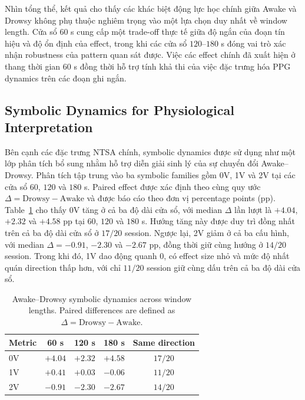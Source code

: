 Nhìn tổng thể, kết quả cho thấy các khác biệt động lực học chính giữa Awake và Drowsy không phụ thuộc nghiêm trọng vào một lựa chọn duy nhất về window length. Cửa sổ $60$ s cung cấp một trade-off thực tế giữa độ ngắn của đoạn tín hiệu và độ ổn định của effect, trong khi các cửa sổ $120$--$180$ s đóng vai trò xác nhận robustness của pattern quan sát được. Việc các effect chính đã xuất hiện ở thang thời gian $60$ s đồng thời hỗ trợ tính khả thi của việc đặc trưng hóa PPG dynamics trên các đoạn ghi ngắn.

\subsection{Symbolic Dynamics for Physiological Interpretation}

Bên cạnh các đặc trưng NTSA chính, symbolic dynamics được sử dụng như một lớp phân tích bổ sung nhằm hỗ trợ diễn giải sinh lý của sự chuyển đổi Awake--Drowsy. Phân tích tập trung vào ba symbolic families gồm 0V, 1V và 2V tại các cửa sổ $60$, $120$ và $180$ s. Paired effect được xác định theo cùng quy ước $\Delta=\mathrm{Drowsy}-\mathrm{Awake}$ và được báo cáo theo đơn vị percentage points (pp). Table~\ref{tab:symbolic_results} cho thấy 0V tăng ở cả ba độ dài cửa sổ, với median $\Delta$ lần lượt là $+4.04$, $+2.32$ và $+4.58$ pp tại $60$, $120$ và $180$ s. Hướng tăng này được duy trì đồng nhất trên cả ba độ dài cửa sổ ở $17/20$ session. Ngược lại, 2V giảm ở cả ba cấu hình, với median $\Delta=-0.91$, $-2.30$ và $-2.67$ pp, đồng thời giữ cùng hướng ở $14/20$ session. Trong khi đó, 1V dao động quanh $0$, có effect size nhỏ và mức độ nhất quán direction thấp hơn, với chỉ $11/20$ session giữ cùng dấu trên cả ba độ dài cửa sổ.

\begin{table}[t]
    \centering
    \caption{Awake--Drowsy symbolic dynamics across window lengths. Paired differences are defined as $\Delta=\mathrm{Drowsy}-\mathrm{Awake}$.}
    \label{tab:symbolic_results}
    \footnotesize
    \setlength{\tabcolsep}{4pt}
    \renewcommand{\arraystretch}{1.10}

    \begin{tabular}{lcccc}
        \toprule
        \textbf{Metric}
        & \textbf{60 s}
        & \textbf{120 s}
        & \textbf{180 s}
        & \textbf{Same direction} \\
        \midrule

        0V
        & $+4.04$
        & $+2.32$
        & $+4.58$
        & $17/20$ \\

        1V
        & $+0.41$
        & $+0.03$
        & $-0.06$
        & $11/20$ \\

        2V
        & $-0.91$
        & $-2.30$
        & $-2.67$
        & $14/20$ \\

        \bottomrule
    \end{tabular}
\end{table}

